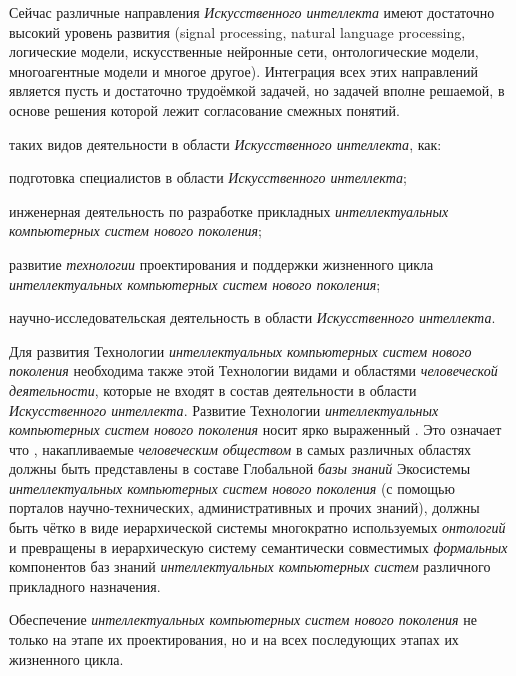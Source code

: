 \begin{textitemize}
	Сейчас различные направления \textit{Искусственного интеллекта} имеют достаточно высокий уровень развития (signal processing, natural language processing, логические модели, искусственные нейронные сети, онтологические модели, многоагентные модели и многое другое). Интеграция всех этих направлений является пусть и достаточно трудоёмкой задачей, но задачей вполне решаемой, в основе решения которой лежит согласование смежных понятий.
	\medskip
	\item {} таких видов деятельности в области \textit{Искусственного интеллекта}, как:
	\begin{textitemize}
		\item подготовка специалистов в области \textit{Искусственного интеллекта};
		\item инженерная деятельность по разработке прикладных \textit{интеллектуальных компьютерных систем нового поколения};
		\item развитие \textit{технологии} проектирования и поддержки жизненного цикла \textit{интеллектуальных компьютерных систем нового поколения};
		\item научно-исследовательская деятельность в области \textit{Искусственного интеллекта}.
	\end{textitemize}
	\item Для развития Технологии \textit{интеллектуальных компьютерных систем нового поколения} необходима также  этой Технологии  видами и областями \textit{человеческой деятельности}, которые не входят в состав деятельности в области \textit{Искусственного интеллекта}. Развитие Технологии \textit{интеллектуальных компьютерных систем нового поколения} носит ярко выраженный . Это означает что , накапливаемые \textit{человеческим обществом} в самых различных областях должны быть представлены в составе Глобальной \textit{базы знаний} Экосистемы \textit{интеллектуальных компьютерных систем нового поколения} (с помощью порталов научно-технических, административных и прочих знаний), должны быть чётко  в виде иерархической системы  многократно используемых \textit{онтологий} и превращены в иерархическую систему семантически совместимых \textit{формальных} компонентов баз знаний \textit{интеллектуальных компьютерных систем} различного прикладного назначения.
	\medskip
	\item Обеспечение  \textit{интеллектуальных компьютерных систем нового поколения} не только на этапе их проектирования, но и на всех последующих этапах их жизненного цикла.

\end{textitemize}
